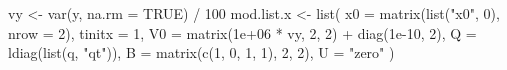 \begin{Schunk}
\begin{Sinput}
 vy <- var(y, na.rm = TRUE) / 100
 mod.list.x <- list(
   x0 = matrix(list("x0", 0), nrow = 2), tinitx = 1,
   V0 = matrix(1e+06 * vy, 2, 2) + diag(1e-10, 2),
   Q = ldiag(list(q, "qt")),
   B = matrix(c(1, 0, 1, 1), 2, 2),
   U = "zero"
 )
\end{Sinput}
\end{Schunk}
